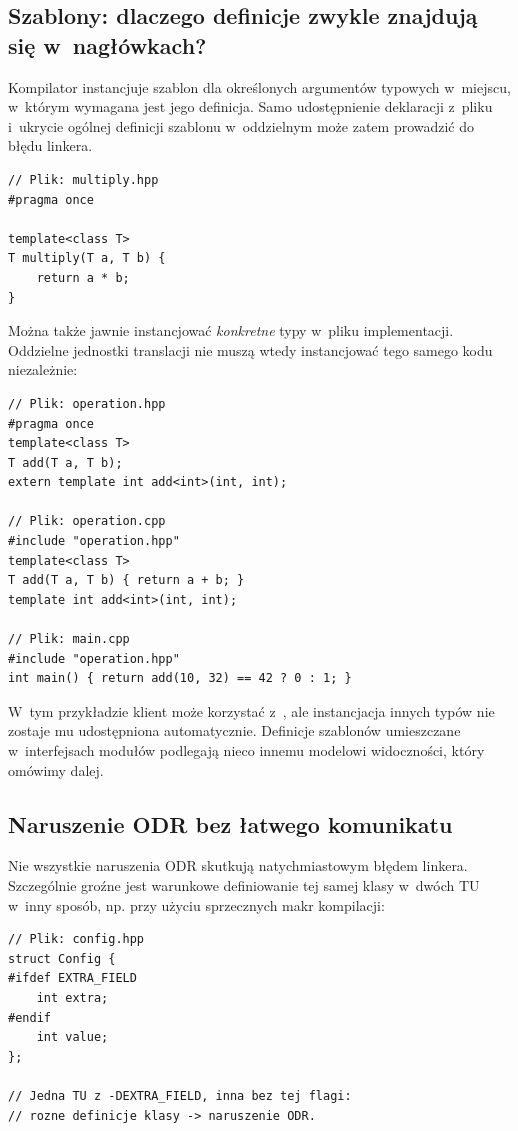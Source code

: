 \subsection{Szablony: dlaczego definicje zwykle znajdują się w~nagłówkach?}

Kompilator instancjuje szablon dla określonych argumentów typowych
w~miejscu, w~którym wymagana jest jego definicja. Samo udostępnienie
deklaracji z~pliku  i~ukrycie ogólnej definicji szablonu
w~oddzielnym  może zatem prowadzić do błędu linkera.

\begin{lstlisting}[caption={Najprostszy, tradycyjny sposob udostepniania szablonu.}]
// Plik: multiply.hpp
#pragma once

template<class T>
T multiply(T a, T b) {
    return a * b;
}
\end{lstlisting}

Można także jawnie instancjować \emph{konkretne} typy w~pliku
implementacji. Oddzielne jednostki translacji nie muszą wtedy
instancjować tego samego kodu niezależnie:

\begin{lstlisting}[caption={Jawna instancjacja okreslonego wariantu szablonu.}]
// Plik: operation.hpp
#pragma once
template<class T>
T add(T a, T b);
extern template int add<int>(int, int);

// Plik: operation.cpp
#include "operation.hpp"
template<class T>
T add(T a, T b) { return a + b; }
template int add<int>(int, int);

// Plik: main.cpp
#include "operation.hpp"
int main() { return add(10, 32) == 42 ? 0 : 1; }
\end{lstlisting}

W~tym przykładzie klient może korzystać z~, ale
instancjacja innych typów nie zostaje mu udostępniona automatycznie.
Definicje szablonów umieszczane w~interfejsach modułów podlegają
nieco innemu modelowi widoczności, który omówimy dalej.

\subsection{Naruszenie ODR bez łatwego komunikatu}

Nie wszystkie naruszenia ODR skutkują natychmiastowym błędem
linkera. Szczególnie groźne jest warunkowe definiowanie tej samej
klasy w~dwóch TU w~inny sposób, np. przy użyciu sprzecznych
makr kompilacji:

\begin{lstlisting}[caption={Przykład niezgodnych definicji typu (celowo błędny).}]
// Plik: config.hpp
struct Config {
#ifdef EXTRA_FIELD
    int extra;
#endif
    int value;
};

// Jedna TU z -DEXTRA_FIELD, inna bez tej flagi:
// rozne definicje klasy -> naruszenie ODR.
\end{lstlisting}

